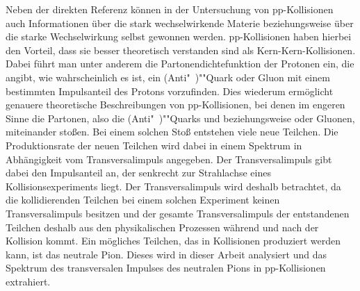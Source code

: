 Neben der direkten Referenz können in der Untersuchung von pp-Kollisionen auch Informationen über die stark wechselwirkende Materie beziehungsweise über die starke Wechselwirkung selbst gewonnen werden.
pp-Kollisionen haben hierbei den Vorteil, dass sie besser theoretisch verstanden sind als Kern-Kern-Kollisionen.
Dabei führt man unter anderem die  Partonendichtefunktion der Protonen ein, die angibt, wie wahrscheinlich es ist, ein (Anti"~)""Quark oder Gluon mit einem bestimmten Impulsanteil des Protons vorzufinden.
Dies wiederum ermöglicht genauere theoretische Beschreibungen von pp-Kollisionen, bei denen im engeren Sinne die Partonen, also die (Anti"~)""Quarks und beziehungsweise oder Gluonen, miteinander stoßen.
\newline
Bei einem solchen Stoß entstehen viele neue Teilchen.
Die Produktionsrate der neuen Teilchen wird dabei in einem Spektrum in Abhängigkeit vom Transversalimpuls angegeben.
Der Transversalimpuls gibt dabei den Impulsanteil an, der senkrecht zur Strahlachse eines Kollisionsexperiments liegt.
Der Transversalimpuls wird deshalb betrachtet, da die kollidierenden Teilchen bei einem solchen Experiment keinen Transversalimpuls besitzen und der gesamte Transversalimpuls der entstandenen Teilchen deshalb aus den physikalischen Prozessen während und nach der Kollision kommt.
\newline
Ein mögliches Teilchen, das in Kollisionen produziert werden kann, ist das neutrale Pion.
Dieses wird in dieser Arbeit analysiert und das Spektrum des transversalen Impulses des neutralen Pions in pp-Kollisionen extrahiert.